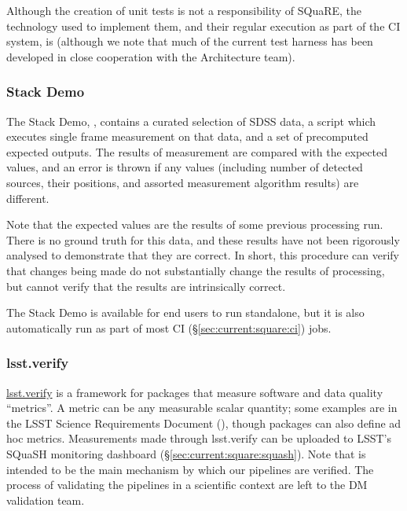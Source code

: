 \documentclass[DM,authoryear,toc,lsstdraft]{lsstdoc}
\begin{document}
Although the creation of unit tests is not a responsibility of SQuaRE, the
technology used to implement them, and their regular execution as part of the
CI system, is (although we note that much of the current test harness has been
developed in close cooperation with the Architecture team).

\subsubsection{Stack Demo}
\label{sec:current:square:demo}

The Stack Demo, , contains a curated
selection of SDSS data, a script which executes single frame measurement on
that data, and a set of precomputed expected outputs. The results of
measurement are compared with the expected values, and an error is thrown if
any values (including number of detected sources, their positions, and
assorted measurement algorithm results) are different.

Note that the expected values are the results of some previous processing run.
There is no ground truth for this data, and these results have not been
rigorously analysed to demonstrate that they are correct. In short, this
procedure can verify that changes being made do not substantially change the
results of processing, but cannot verify that the results are intrinsically
correct.

The Stack Demo is available for end users to run standalone, but it is also
automatically run as part of most CI (\S\ref{sec:current:square:ci}) jobs.

\subsubsection{lsst.verify}
\label{sec:current:square:verify}


\href{https://github.com/lsst/verify}{lsst.verify} is a framework for packages
that measure software and data quality ``metrics''. A metric can be any
measurable scalar quantity; some examples are in the LSST Science Requirements
Document (), though packages can also define ad hoc metrics.
Measurements made through lsst.verify can be uploaded to LSST's SQuaSH
monitoring dashboard (\S\ref{sec:current:square:squash}).  Note that 
is intended to be the main mechanism by which our pipelines are verified.
The process of validating the pipelines in a scientific context are left
to the DM validation team.
\end{document}
